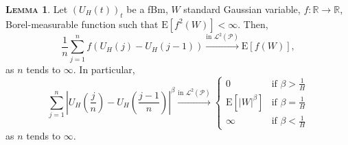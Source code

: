 \documentclass[a4paper, twoside, 11pt]{article}
\theoremstyle{definition}
\newtheorem{lemma}[definition]{\scshape Lemma}
\begin{document}
  \begin{lemma}
	Let $(U_H(t))_{t}$ be a fBm, $W$ standard Gaussian variable, $f: \mathbb{R}\rightarrow \mathbb{R}$, Borel-measurable function such that $\mathrm{E}[f^2(W)] < \infty$. Then, 
	\begin{equation*}
	  \frac{1}{n}\sum\limits_{j=1}^n f(U_H(j)-U_H(j-1)) \overset{\text{in }\mathcal{L}^2(\mathcal{P})}{\rightarrow} \mathrm{E}[f(W)],
	\end{equation*}
	as $n$ tends to $\infty$. In particular,
	\begin{equation}
	  \sum_{j=1}^n |U_H(\frac{j}{n}) - U_H(\frac{j-1}{n})|^\beta \overset{\text{in }\mathcal{L}^2(\mathcal{P})}{\rightarrow} \begin{cases}
		0 &\mbox{if } \beta > \frac{1}{H}\\
		\mathrm{E}[|W|^\beta] &\mbox{if } \beta = \frac{1}{H}\\
		\infty &\mbox{if } \beta < \frac{1}{H}
	  \end{cases}
	  \label{sec:semilemma}
	\end{equation}
	as $n$ tends to $\infty$.
  \end{lemma}
\end{document}
